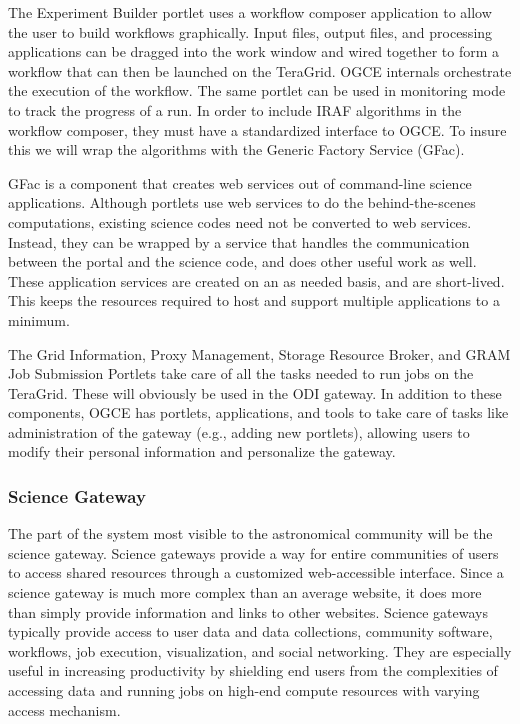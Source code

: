 \documentclass[10pt,conference]{IEEEtran}
\begin{document}
The Experiment Builder portlet uses a workflow composer application to allow the user to build workflows graphically. Input files, output files, and processing applications can be dragged into the work window and wired together to form a workflow that can then be launched on the TeraGrid. OGCE internals orchestrate the execution of the workflow. The same portlet can be used in monitoring mode to track the progress of a run. In order to include IRAF algorithms in the workflow composer, they must have a standardized interface to OGCE. To insure this we will wrap the algorithms with the Generic Factory Service (GFac).
 
GFac is a component that creates web services out of command-line science applications. Although portlets use web services to do the behind-the-scenes computations, existing science codes need not be converted to web services. Instead, they can be wrapped by a service that handles the communication between the portal and the science code, and does other useful work as well. These application services are created on an as needed basis, and are short-lived. This keeps the resources required to host and support multiple applications to a minimum.

The Grid Information, Proxy Management, Storage Resource Broker, and GRAM Job Submission Portlets take care of all the tasks needed to run jobs on the TeraGrid. These will obviously be used in the ODI gateway. In addition to these components, OGCE has portlets, applications, and tools to take care of tasks like administration of the gateway (e.g., adding new portlets), allowing users to modify their personal information and personalize the gateway. 

\subsubsection{Science Gateway}

The part of the system most visible to the astronomical community will be the science gateway. Science gateways provide a way for entire communities of users to access shared resources through a customized web-accessible interface. Since a science gateway is much more complex than an average website, it does more than simply provide information and links to other websites. Science gateways typically provide access to user data and data collections, community software, workflows, job execution, visualization, and social networking. They are especially useful in increasing productivity by shielding end users from the complexities of accessing data and running jobs on high-end compute resources with varying access mechanism.
\end{document}
